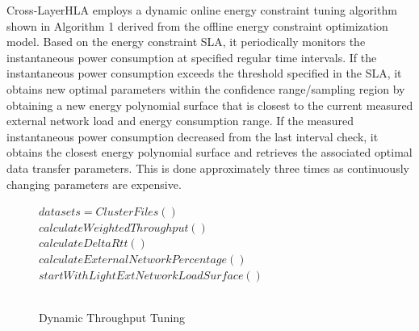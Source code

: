 \documentclass[conference]{IEEEtran}
\makeatletter
\newcommand{\removelatexerror}{\let\@latex@error\@gobble}
\makeatother
\begin{document}
Cross-LayerHLA employs a dynamic online energy constraint tuning algorithm shown in Algorithm 1 derived from the offline energy constraint optimization model. Based on the energy constraint SLA, 
it periodically monitors the instantaneous power consumption at specified regular time intervals. If the instantaneous power consumption exceeds the threshold specified in the SLA, it obtains new optimal parameters within the confidence range/sampling region by obtaining a new energy polynomial surface that is closest to the current measured external network load and energy consumption range. If the measured instantaneous power consumption decreased from the last interval check, it obtains the closest energy polynomial surface and retrieves the associated optimal data transfer parameters. This is done approximately three times as continuously changing parameters are expensive.

\begin{figure}[!t]
\removelatexerror%
\begin{algorithm}[H]

  $datasets = ClusterFiles()$ \\
   {
     $calculateWeightedThroughput()$ \\
     $calculateDeltaRtt()$   \\
     $calculateExternalNetworkPercentage()$\\
     $startWithLightExtNetworkLoadSurface()$\\
      {\\
     }%
}%
\caption{Dynamic Throughput Tuning}
\end{algorithm}
\end{figure}
\end{document}
